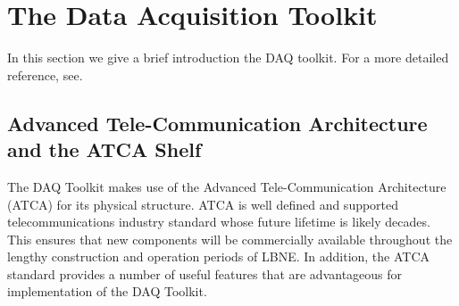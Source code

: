 \section{The Data Acquisition Toolkit}



In this section we give a brief introduction the DAQ toolkit.
For a more detailed reference, see\cite{DAQ_REF}.
\subsection{Advanced Tele-Communication Architecture and the ATCA Shelf}
\label{sec:ATCA}
The DAQ Toolkit makes use of the Advanced Tele-Communication Architecture
(ATCA) for its physical structure.
ATCA is well defined and supported telecommunications industry standard whose 
future lifetime is likely decades.
This ensures that new components will be commercially available throughout the
lengthy construction and operation periods of LBNE.
In addition, the ATCA standard provides a number of useful features that 
are advantageous for implementation of the DAQ Toolkit.


